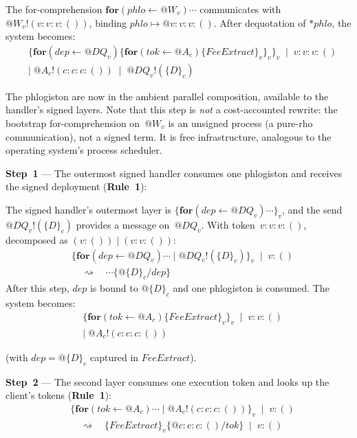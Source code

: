 \documentclass[11pt,a4paper]{article}
\makeatletter
\newcommand{\Par}{\mathbin{|}}
\newcommand{\forc}{\mathbf{for}}
\newcommand{\send}[2]{#1 !\!\left( #2 \right)}
\newcommand{\recv}[3]{\forc\!\left( #1 \leftarrow #2 \right) #3}
\newcommand{\drop}[1]{{\ast} #1}
\newcommand{\quot}[1]{@#1}
\newcommand{\signed}[2]{\{#1\}_{#2}}
\newcommand{\red}{\rightsquigarrow}
\makeatother
\begin{document}
The for-comprehension $\recv{\mathit{phlo}}{\quot{W_v}}{\cdots}$
communicates with $\send{\quot{W_v}}{v : v : v : ()}$, binding
$\mathit{phlo} \mapsto \quot{v : v : v : ()}$.  After
dequotation of $\drop{\mathit{phlo}}$, the system becomes:
\begin{align*}
  &\signed{
    \recv{\mathit{dep}}{\quot{DQ_v}}{
      \signed{
        \recv{\mathit{tok}}{\quot{A_c}}{
          \signed{\mathit{FeeExtract}}{v}
        }
      }{v}
    }
  }{v}
  \;\Par\; v : v : v : ()
  \\
  &\Par\; \send{\quot{A_c}}{c : c : c : ()}
  \;\Par\;
  \send{\quot{DQ_v}}{\signed{D}{c}}
\end{align*}

\noindent
The phlogiston are now in the ambient parallel
composition, available to the handler's signed layers.  Note
that this step is \emph{not} a cost-accounted rewrite: the
bootstrap for-comprehension on~$\quot{W_v}$ is an unsigned
process (a pure-rho communication), not a signed term.  It
is free infrastructure, analogous to the operating system's
process scheduler.

\bigskip
\noindent
\textbf{Step~1} --- The outermost signed handler consumes one
phlogiston and receives the signed deployment
(\textbf{Rule~1}):

The signed handler's outermost layer is
$\signed{\recv{\mathit{dep}}{\quot{DQ_v}}{\cdots}}{v}$, and the send
$\send{\quot{DQ_v}}{\signed{D}{c}}$ provides a message on~$\quot{DQ_v}$.  With
token~$v : v : v : ()$, decomposed as
$(v : ()) \Par (v : v : ())$:
\begin{align*}
  &\signed{
    \recv{\mathit{dep}}{\quot{DQ_v}}{\cdots} \Par \send{\quot{DQ_v}}{\signed{D}{c}}
  }{v}
  \;\Par\; v : ()
  \\
  &\quad\red\quad
  \cdots\bigl\{\quot{\signed{D}{c}}\big/\mathit{dep}\bigr\}
\end{align*}
After this step, $\mathit{dep}$ is bound to
$\quot{\signed{D}{c}}$ and one phlogiston is consumed.
The system becomes:
\begin{align*}
  &\signed{
    \recv{\mathit{tok}}{\quot{A_c}}{
      \signed{\mathit{FeeExtract}}{v}
    }
  }{v}
  \;\Par\; v : v : ()
  \\
  &\Par\; \send{\quot{A_c}}{c : c : c : ()}
\end{align*}

\noindent
(with $\mathit{dep} = \quot{\signed{D}{c}}$ captured in
$\mathit{FeeExtract}$).

\bigskip
\noindent
\textbf{Step~2} --- The second layer consumes one execution
token and looks up the client's tokens (\textbf{Rule~1}):
\begin{align*}
  &\signed{
    \recv{\mathit{tok}}{\quot{A_c}}{\cdots}
    \Par \send{\quot{A_c}}{c : c : c : ()}
  }{v}
  \;\Par\; v : ()
  \\
  &\quad\red\quad
  \signed{\mathit{FeeExtract}}{v}
    \bigl\{\quot{c : c : c : ()}\big/\mathit{tok}\bigr\}
  \;\Par\; v : ()
\end{align*}
\end{document}
